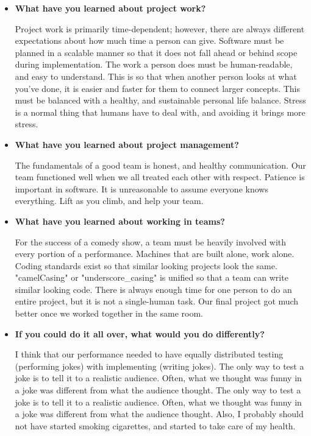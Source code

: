 \begin{itemize}
\item{\textbf{What have you learned about project work?}}

    Project work is primarily time-dependent; however, there are always different expectations about how much time a person can give.
    Software must be planned in a scalable manner so that it does not fall ahead or behind scope during implementation.
    The work a person does must be human-readable, and easy to understand.
    This is so that when another person looks at what you've done, it is easier and faster for them to connect larger concepts.
    This must be balanced with a healthy, and sustainable personal life balance.
    Stress is a normal thing that humans have to deal with, and avoiding it brings more stress.




\item{\textbf{What have you learned about project management?}}

    The fundamentals of a good team is honest, and healthy communication.
    Our team functioned well when we all treated each other with respect.
    Patience is important in software. It is unreasonable to assume everyone knows everything.
    Lift as you climb, and help your team.


\item{\textbf{What have you learned about working in teams?}}

    For the success of a comedy show, a team must be heavily involved with every portion of a performance.
    Machines that are built alone, work alone. Coding standards exist so that similar looking projects look the same.
    "camelCasing" or "underscore\_casing" is unified so that a team can write similar looking code.
    There is always enough time for one person to do an entire project, but it is not a single-human task.
    Our final project got much better once we worked together in the same room.


\item{\textbf{If you could do it all over, what would you do differently?}}

    I think that our performance needed to have equally distributed testing (performing jokes) with implementing (writing jokes).
	The only way to test a joke is to tell it to a realistic audience.
	Often, what we thought was funny in a joke was different from what the audience thought.
	 The only way to test a joke is to tell it to a realistic audience.
	 Often, what we thought was funny in a joke was different from what the audience thought.
	 Also, I probably should not have started smoking cigarettes, and started to take care of my health.

	 \end{itemize}



